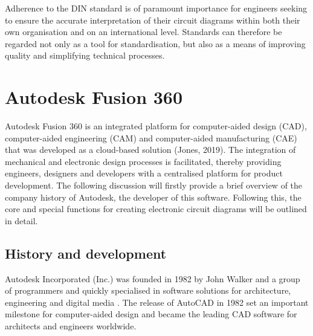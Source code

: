 Adherence to the DIN standard is of paramount importance for engineers seeking to ensure the accurate interpretation of their circuit diagrams within both their own organisation and on an international level. Standards can therefore be regarded not only as a tool for standardisation, but also as a means of improving quality and simplifying technical processes.
\section{Autodesk Fusion 360}
\label{Autodesk}
Autodesk Fusion 360 is an integrated platform for computer-aided design (CAD), computer-aided engineering (CAM) and computer-aided manufacturing (CAE) that was developed as a cloud-based solution (Jones, 2019). The integration of mechanical and electronic design processes is facilitated, thereby providing engineers, designers and developers with a centralised platform for product development. The following discussion will firstly provide a brief overview of the company history of Autodesk, the developer of this software. Following this, the core and special functions for creating electronic circuit diagrams will be outlined in detail.

\subsection*{History and development}
Autodesk Incorporated (Inc.) was founded in 1982 by John Walker and a group of programmers and quickly specialised in software solutions for architecture, engineering and digital media \autocite{wikipedia_autodesk}.
The release of AutoCAD in 1982 set an important milestone for computer-aided design and became the leading CAD software for architects and engineers worldwide\autocite{wikipedia_autocad_version_history}.


